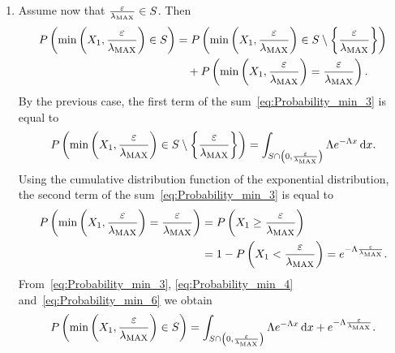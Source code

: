 \begin{enumerate}[label=\arabic*., topsep=10pt]
\item Assume now that $\frac{\varepsilon}{\lambda_{\mathrm{MAX}}} \in S$. Then
\begin{equation}
\begin{split}
P\left(\min\left(X_1, \frac{\varepsilon}{\lambda_{\mathrm{MAX}}} \right) \in S \right)
  &= P\left(\min\left(X_1, \frac{\varepsilon}{\lambda_{\mathrm{MAX}}} \right) \in S \setminus \left\{\frac{\varepsilon}{\lambda_{\mathrm{MAX}}}\right\} \right) \\
  &\quad + P\left(\min\left(X_1, \frac{\varepsilon}{\lambda_{\mathrm{MAX}}} \right) = \frac{\varepsilon}{\lambda_{\mathrm{MAX}}} \right).
\end{split}
\label{eq:Probability_min_3}
\end{equation}
By the previous case, the first term of the sum~\eqref{eq:Probability_min_3} is equal to
\begin{equation}
P\left(\min\left(X_1, \frac{\varepsilon}{\lambda_{\mathrm{MAX}}} \right) \in S \setminus \left\{\frac{\varepsilon}{\lambda_{\mathrm{MAX}}}\right\} \right) = \int_{S \cap \left(0, \frac{\varepsilon}{\lambda_{\mathrm{MAX}}}\right)} \Lambda e^{-\Lambda x} \,\mathrm{d} x.
\label{eq:Probability_min_4}
\end{equation}
Using the cumulative distribution function of the exponential distribution, the second term of the sum~\eqref{eq:Probability_min_3} is equal to
\begin{equation}
\begin{split}
P\left(\min\left(X_1, \frac{\varepsilon}{\lambda_{\mathrm{MAX}}} \right) = \frac{\varepsilon}{\lambda_{\mathrm{MAX}}} \right) &= P\left(X_1 \geq \frac{\varepsilon}{\lambda_{\mathrm{MAX}}} \right) \\
  &= 1 - P\left(X_1 < \frac{\varepsilon}{\lambda_{\mathrm{MAX}}} \right) = e^{-\Lambda\frac{\varepsilon}{\lambda_{\mathrm{MAX}}}}.
\end{split}
\label{eq:Probability_min_6}
\end{equation}
From~\eqref{eq:Probability_min_3}, \eqref{eq:Probability_min_4} and~\eqref{eq:Probability_min_6} we obtain
\begin{equation}
P\left(\min\left(X_1, \frac{\varepsilon}{\lambda_{\mathrm{MAX}}} \right) \in S \right) = \int_{S \cap \left(0, \frac{\varepsilon}{\lambda_{\mathrm{MAX}}}\right)} \Lambda e^{-\Lambda x} \,\mathrm{d} x + e^{-\Lambda\frac{\varepsilon}{\lambda_{\mathrm{MAX}}}}.
\label{eq:Probability_min_23}
\end{equation}
\end{enumerate}

